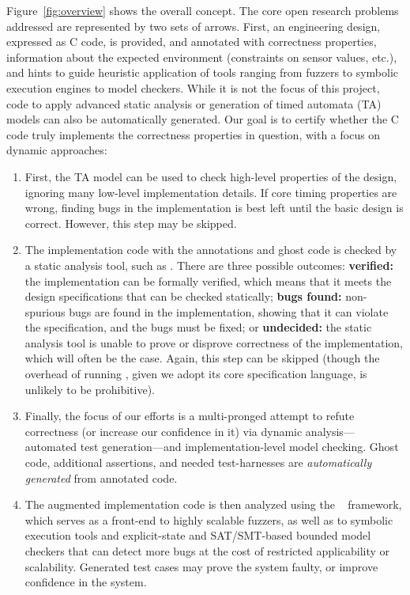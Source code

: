 Figure~\ref{fig:overview} shows the overall concept.  The core
open research problems addressed are represented by two sets of
arrows.  First, an engineering design, expressed as C code, is
provided, and annotated with correctness properties, information
about the expected environment (constraints on sensor values, etc.),
and hints to guide heuristic application of tools ranging from fuzzers
to symbolic execution engines to model checkers.
While it is not the focus of this project, code to apply advanced static analysis or generation of timed
automata (TA) models can also be automatically generated.  
Our goal is to certify whether the C code truly implements the
correctness properties in question, with a focus on dynamic approaches:
\begin{enumerate}[labelsep=3pt,leftmargin=12pt]
\item First, the TA model can be used to check high-level properties
  of the design, ignoring many low-level implementation details.  If
  core timing properties are wrong, finding bugs in the implementation
  is best left until the basic design is correct.  However, this step
  may be skipped.
\item The implementation code with the \acsl annotations and ghost code
  is checked by a static analysis tool, such as \framac.
  There are three possible outcomes:
  {\bf verified:} the implementation can be formally verified, which
  means that it meets the design specifications that can be checked statically;
  {\bf bugs found:} non-spurious bugs are found in the implementation, showing that
    it can violate the specification, and the bugs must be fixed; or
  {\bf undecided:} the static analysis tool is unable to prove or
  disprove correctness of the implementation, which will often be the
  case.  Again, this step can be skipped (though the overhead of
  running \framac, given we adopt its core specification language, is
  unlikely to be prohibitive).
\item Finally, the focus of our efforts is a multi-pronged attempt to refute correctness (or increase our confidence
  in it) via dynamic analysis---automated test generation---and
  implementation-level model checking.
  Ghost code, additional assertions, and needed test-harnesses are \emph{automatically generated} from 
  annotated code.
\item The augmented implementation code is then analyzed using the
  \deepstate~\cite{DeepState} framework, which serves as a front-end
  to highly scalable fuzzers, as well as to symbolic execution tools
  and explicit-state and SAT/SMT-based bounded model checkers that can
  detect more bugs at the cost of restricted applicability or scalability.  Generated test cases may
  prove the system faulty, or improve confidence in the system.
\end{enumerate}


